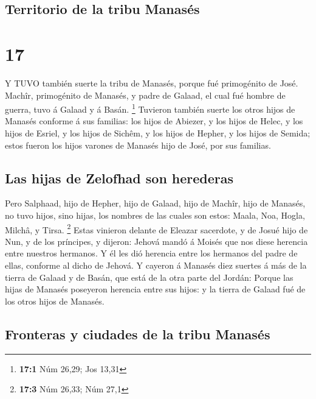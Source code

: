 \hypertarget{territorio-de-la-tribu-manasuxe9s}{%
\subsection{Territorio de la tribu
Manasés}\label{territorio-de-la-tribu-manasuxe9s}}

\hypertarget{section-16}{%
\section{17}\label{section-16}}

 Y TUVO también suerte la tribu de Manasés, porque fué
primogénito de José. Machîr, primogénito de Manasés, y padre de Galaad,
el cual fué hombre de guerra, tuvo á Galaad y á Basán. \footnote{\textbf{17:1}
  Núm 26,29; Jos 13,31}  Tuvieron también suerte los otros
hijos de Manasés conforme á sus familias: los hijos de Abiezer, y los
hijos de Helec, y los hijos de Esriel, y los hijos de Sichêm, y los
hijos de Hepher, y los hijos de Semida; estos fueron los hijos varones
de Manasés hijo de José, por sus familias.

\hypertarget{las-hijas-de-zelofhad-son-herederas}{%
\subsection{Las hijas de Zelofhad son
herederas}\label{las-hijas-de-zelofhad-son-herederas}}

 Pero Salphaad, hijo de Hepher, hijo de Galaad, hijo de
Machîr, hijo de Manasés, no tuvo hijos, sino hijas, los nombres de las
cuales son estos: Maala, Noa, Hogla, Milchâ, y Tirsa. \footnote{\textbf{17:3}
  Núm 26,33; Núm 27,1}  Estas vinieron delante de Eleazar
sacerdote, y de Josué hijo de Nun, y de los príncipes, y dijeron: Jehová
mandó á Moisés que nos diese herencia entre nuestros hermanos. Y él les
dió herencia entre los hermanos del padre de ellas, conforme al dicho de
Jehová.  Y cayeron á Manasés diez suertes á más de la tierra
de Galaad y de Basán, que está de la otra parte del Jordán: 
Porque las hijas de Manasés poseyeron herencia entre sus hijos: y la
tierra de Galaad fué de los otros hijos de Manasés.

\hypertarget{fronteras-y-ciudades-de-la-tribu-manasuxe9s}{%
\subsection{Fronteras y ciudades de la tribu
Manasés}\label{fronteras-y-ciudades-de-la-tribu-manasuxe9s}}

